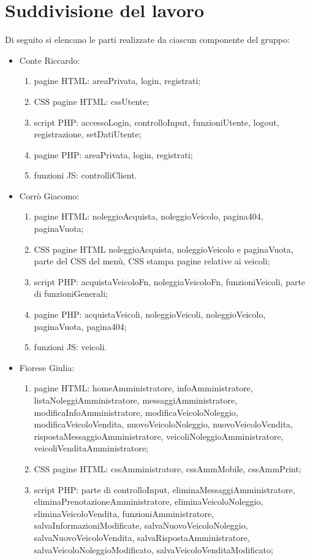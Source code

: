 \section{Suddivisione del lavoro}
Di seguito si elencano le parti realizzate da ciascun componente del gruppo:
\begin{itemize}
    \item Conte Riccardo:
        \begin{enumerate}
        \item pagine HTML: areaPrivata, login, registrati;
        \item CSS pagine HTML: cssUtente;
        \item script PHP: accessoLogin, controlloInput, funzioniUtente, logout, registrazione, setDatiUtente;
        \item pagine PHP: areaPrivata, login, registrati;
        \item funzioni JS: controlliClient.
        \end{enumerate}
    \item Corrò Giacomo:
        \begin{enumerate}
            \item pagine HTML: noleggioAcquista, noleggioVeicolo, pagina404, paginaVuota;
            \item CSS pagine HTML noleggioAcquista, noleggioVeicolo e paginaVuota, parte del CSS del menù, CSS stampa pagine relative ai veicoli;
            \item script PHP: acquistaVeicoloFn, noleggiaVeicoloFn, funzioniVeicoli, parte di funzioniGenerali;
            \item pagine PHP: acquistaVeicoli, noleggioVeicoli, noleggioVeicolo, paginaVuota, pagina404;
            \item funzioni JS: veicoli.
        \end{enumerate}
    \item Fiorese Giulia:
        \begin{enumerate}
            \item pagine HTML: homeAmministratore, infoAmministratore, listaNoleggiAmministratore, messaggiAmministratore, modificaInfoAmministratore, modificaVeicoloNoleggio, modificaVeicoloVendita, nuovoVeicoloNoleggio, nuovoVeicoloVendita, rispostaMessaggioAmministratore, veicoliNoleggioAmministratore, veicoliVenditaAmministratore;
            \item CSS pagine HTML: cssAmministratore, cssAmmMobile, cssAmmPrint;
            \item script PHP: parte di controlloInput, eliminaMessaggiAmministratore, eliminaPrenotazioneAmministratore, eliminaVeicoloNoleggio, eliminaVeicoloVendita, funzioniAmministratore, salvaInformazioniModificate, salvaNuovoVeicoloNoleggio, salvaNuovoVeicoloVendita, salvaRispostaAmministratore, salvaVeicoloNoleggioModificato, salvaVeicoloVenditaModificato;

\end{enumerate}
\end{itemize}
